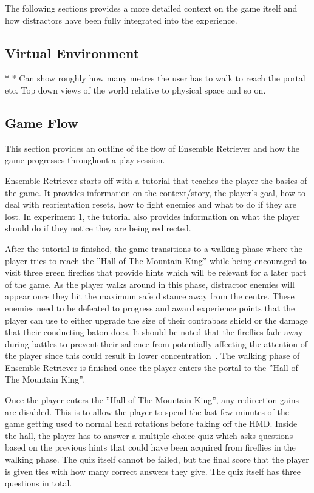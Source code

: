 The following sections provides a more detailed context on the game itself and how distractors have been fully integrated into the experience.

\subsection{Virtual Environment}
* 
* Can show roughly how many metres the user has to walk to reach the portal etc. Top down views of the world relative to physical space and so on. 

\subsection{Game Flow}
This section provides an outline of the flow of Ensemble Retriever and how the game progresses throughout a play session. 

Ensemble Retriever starts off with a tutorial that teaches the player the basics of the game. It provides information on the context/story, the player's goal, how to deal with reorientation resets, how to fight enemies and what to do if they are lost. In experiment 1, the tutorial also provides information on what the player should do if they notice they are being redirected. 

After the tutorial is finished, the game transitions to a walking phase where the player tries to reach the ''Hall of The Mountain King'' while being encouraged to visit three green fireflies that provide hints which will be relevant for a later part of the game. As the player walks around in this phase, distractor enemies will appear once they hit the maximum safe distance away from the centre. These enemies need to be defeated to progress and award experience points that the player can use to either upgrade the size of their contrabass shield or the damage that their conducting baton does. It should be noted that the fireflies fade away during battles to prevent their salience from potentially affecting the attention of the player since this could result in lower concentration~\cite{sitzmann2018saliency}. The walking phase of Ensemble Retriever is finished once the player enters the portal to the ''Hall of The Mountain King''. 

Once the player enters the ''Hall of The Mountain King'', any redirection gains are disabled. This is to allow the player to spend the last few minutes of the game getting used to normal head rotations before taking off the HMD. Inside the hall, the player has to answer a multiple choice quiz which asks questions based on the previous hints that could have been acquired from fireflies in the walking phase. The quiz itself cannot be failed, but the final score that the player is given ties with how many correct answers they give. The quiz itself has three questions in total.

